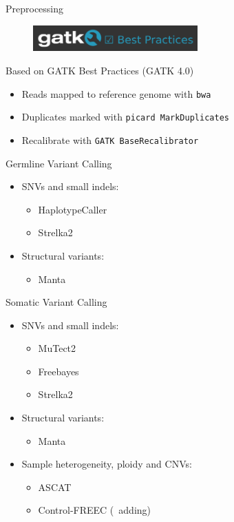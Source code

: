 \documentclass[usepdftitle=false]{beamer}
\begin{document}
\begin{frame}{Preprocessing}
	\begin{figure}
		\includegraphics[height=1cm]{pictures/GATKBP}
	\end{figure}
	Based on GATK Best Practices (GATK 4.0)
	\pause

	\begin{itemize}
		\item Reads mapped to reference genome with \texttt{bwa}
		\pause
		\item Duplicates marked with \texttt{picard MarkDuplicates}
		\pause
		\item Recalibrate with \texttt{GATK BaseRecalibrator}
	\end{itemize}

\end{frame}

\begin{frame}{Germline Variant Calling}
	\begin{itemize}
		\item SNVs and small indels:
		\pause
	\begin{itemize}
			\item HaplotypeCaller
			\item Strelka2
		\end{itemize}
		\pause
		\item Structural variants:
		\pause
		\begin{itemize}
			\item Manta
		\end{itemize}
	\end{itemize}
\end{frame}

\begin{frame}{Somatic Variant Calling}
	\begin{itemize}
		\item SNVs and small indels:
		\pause
		\begin{itemize}
			\item MuTect2
			\item Freebayes
			\item Strelka2
		\end{itemize}
		\pause
		\item Structural variants:
		\pause
		\begin{itemize}
			\item Manta
		\end{itemize}
		\pause
		\item Sample heterogeneity, ploidy and CNVs:
		\pause
		\begin{itemize}
			\item ASCAT
			\item Control-FREEC (\faWrench\ adding)
		\end{itemize}
	\end{itemize}
\end{frame}
\end{document}
